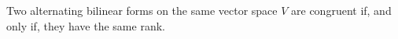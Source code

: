 Two alternating bilinear forms on the same vector space $V$ are congruent if, and only if, they have the same rank.
